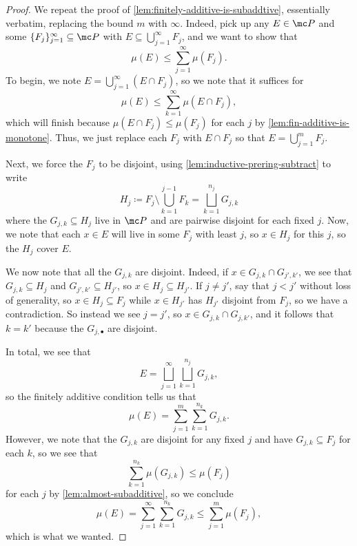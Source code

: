 \documentclass[../notes.tex]{subfiles}
\begin{document}
\begin{proof}
	We repeat the proof of \autoref{lem:finitely-additive-is-subaddtive}, essentially verbatim, replacing the bound $m$ with $\infty$. Indeed, pick up any $E\in\mc P$ and some $\{F_j\}_{j=1}^\infty\subseteq\mc P$ with $E\subseteq\bigcup_{j=1}^\infty F_j$, and we want to show that
	\[\mu(E)\le\sum_{j=1}^\infty\mu(F_j).\]
	To begin, we note $E=\bigcup_{j=1}^\infty(E\cap F_j)$, so we note that it suffices for
	\[\mu(E)\le\sum_{k=1}^\infty\mu(E\cap F_j),\]
	which will finish because $\mu(E\cap F_j)\le\mu(F_j)$ for each $j$ by \autoref{lem:fin-additive-is-monotone}. Thus, we just replace each $F_j$ with $E\cap F_j$ so that $E=\bigcup_{j=1}^mF_j$.
	
	Next, we force the $F_j$ to be disjoint, using \autoref{lem:inductive-prering-subtract} to write
	\[H_j\coloneqq F_j\setminus\bigcup_{k=1}^{j-1}F_k=\bigsqcup_{k=1}^{n_j}G_{j,k}\]
	where the $G_{j,k}\subseteq H_j$ live in $\mc P$ and are pairwise disjoint for each fixed $j$. Now, we note that each $x\in E$ will live in some $F_j$ with least $j$, so $x\in H_j$ for this $j$, so the $H_j$ cover $E$.

	We now note that all the $G_{j,k}$ are disjoint. Indeed, if $x\in G_{j,k}\cap G_{j',k'}$, we see that $G_{j,k}\subseteq H_j$ and $G_{j',k'}\subseteq H_{j'}$, so $x\in H_j\subseteq H_{j'}$. If $j\ne j'$, say that $j<j'$ without loss of generality, so $x\in H_j\subseteq F_j$ while $x\in H_{j'}$ has $H_{j'}$ disjoint from $F_j$, so we have a contradiction. So instead we see $j=j'$, so $x\in G_{j,k}\cap G_{j,k'}$, and it follows that $k=k'$ because the $G_{j,\bullet}$ are disjoint.

	In total, we see that
	\[E=\bigsqcup_{j=1}^\infty\bigsqcup_{k=1}^{n_j}G_{j,k},\]
	so the finitely additive condition tells us that
	\[\mu(E)=\sum_{j=1}^m\sum_{k=1}^{n_k}G_{j,k}.\]
	However, we note that the $G_{j,k}$ are disjoint for any fixed $j$ and have $G_{j,k}\subseteq F_j$ for each $k$, so we see that
	\[\sum_{k=1}^{n_k}\mu(G_{j,k})\le\mu(F_j)\]
	for each $j$ by \autoref{lem:almost-subadditive}, so we conclude
	\[\mu(E)=\sum_{j=1}^\infty\sum_{k=1}^{n_k}G_{j,k}\le\sum_{j=1}^m\mu(F_j),\]
	which is what we wanted.
\end{proof}
\end{document}
